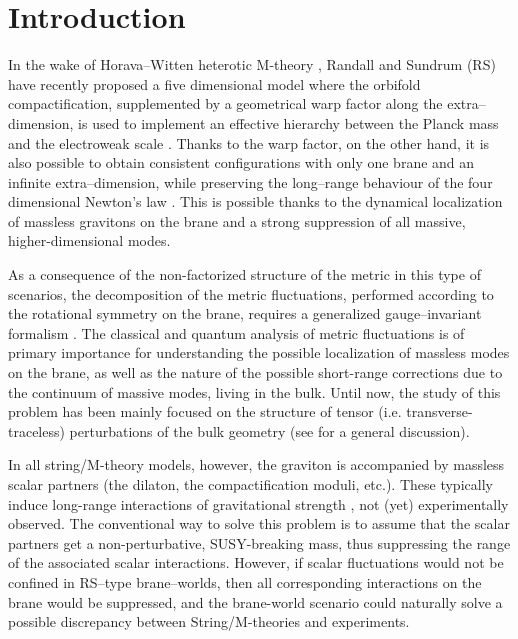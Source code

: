 \documentclass[a4paper,12pt]{article}
\begin{document}
\section{Introduction}

In the wake of Horava--Witten heterotic M-theory \cite{HW},
Randall and Sundrum (RS) have recently proposed a five dimensional
model where the orbifold compactification, supplemented by a
geometrical warp factor along the extra--dimension, is used to
implement an effective hierarchy between the Planck mass and
the electroweak scale \cite{RS1}. Thanks to the warp factor, on the
other hand, it is also possible to obtain consistent configurations with
only one brane and an infinite extra--dimension, while preserving the
long--range behaviour of the four dimensional Newton's law \cite{RS2}.
This is possible thanks to the dynamical localization of massless
gravitons on the brane and a strong suppression of all massive,
higher-dimensional modes.

As a consequence of the non-factorized structure of the metric in this
type of scenarios, the decomposition of the metric fluctuations,
performed according to the rotational \coordHE{} symmetry on the brane,
requires a generalized gauge--invariant formalism \cite{BDBL}. The
classical and quantum analysis of metric fluctuations is of primary
importance for understanding the possible localization of massless
modes on the brane, as well as the nature of the possible
short-range corrections  due to the continuum of massive modes, living
in the bulk. Until now, the study of this problem has been mainly
focused on the structure of tensor (i.e. transverse-traceless)
perturbations of the bulk geometry (see \cite{CEHS} for a general
discussion).

In all string/M-theory models, however, the graviton is
accompanied by massless scalar partners (the dilaton, the
compactification moduli, etc.). These typically induce long-range
interactions of gravitational strength \cite{TV}, not (yet)
experimentally observed. The conventional  way to solve this problem
is to assume that the scalar partners get a non-perturbative,
SUSY-breaking mass, thus suppressing the range of the associated
scalar interactions. However, if scalar fluctuations would not be
confined in RS--type brane--worlds, then all corresponding interactions
on the brane would be suppressed,  and the brane-world scenario could
naturally solve a possible discrepancy between String/M-theories and
experiments.
\end{document}
